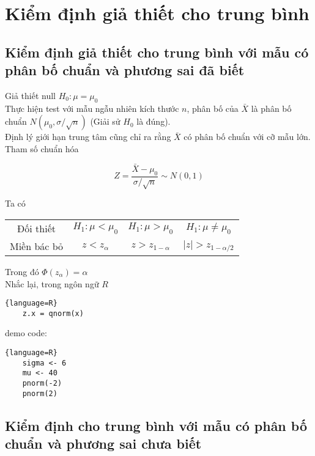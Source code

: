 \chapter{Kiểm định giả thiết cho trung bình}

\section{Kiểm định giả thiết cho trung bình với mẫu có phân bố chuẩn và phương sai đã biết}
Giả thiết null $H_0: \mu = \mu_0$ \\
Thực hiện test với mẫu ngẫu nhiên kích thước $n$, phân bố của $\bar{X}$ là phân bố chuẩn $N(\mu_0, \sigma / \sqrt{n})$
(Giải sử $H_0$ là đúng). \\
Định lý giới hạn trung tâm cũng chỉ ra rằng $\bar{X}$ có phân bố chuẩn với cỡ mẫu lớn. \\
Tham số chuẩn hóa 

\begin{equation}
    Z = \frac{\bar{X} - \mu_0}{\sigma / \sqrt{n}} \sim N(0, 1)
\end{equation}

Ta có

\begin{center}
    \begin{tabular}{| c | c | c | c |}
        \hline
        Đối thiết & $H_1: \mu < \mu_0$ & $H_1: \mu > \mu_0$ & $H_1: \mu \neq \mu_0$ \\
        Miền bác bỏ & $z < z_{\alpha}$ & $z > z_{1-\alpha}$ & $\lvert z \rvert > z_{1 - \alpha / 2}$ \\
        \hline
    \end{tabular}
\end{center}

Trong đó $\Phi(z_\alpha) = \alpha$ \\
Nhắc lại, trong ngôn ngữ $R$
\begin{lstlisting}{language=R}
    z.x = qnorm(x)
\end{lstlisting}

demo code: 
\begin{lstlisting}{language=R}
    sigma <- 6
    mu <- 40
    pnorm(-2)
    pnorm(2)
\end{lstlisting}


\section{Kiểm định cho trung bình với mẫu có phân bố chuẩn và phương sai chưa biết}

